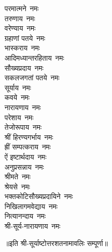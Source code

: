 \begin{flushleft}
\begin{multicols}{2}
परमात्मने~नमः\\
तरुणाय~नमः\\
वरेण्याय~नमः\\
ग्रहाणां पतये~नमः\\
भास्कराय~नमः\hfill{}\\
आदिमध्यान्तरहिताय~नमः\\
सौख्यप्रदाय~नमः\\
सकलजगतां पतये~नमः\\
सूर्याय~नमः\\
कवये~नमः\\
नारायणाय~नमः\\
परेशाय~नमः\\
तेजोरूपाय~नमः\\
श्रीं हिरण्यगर्भाय~नमः\\
ह्रीं सम्पत्कराय~नमः\hfill{}\\
ऐं इष्टार्थदाय~नमः\\
अनुप्रसन्नाय~नमः\\
श्रीमते~नमः\\
श्रेयसे~नमः\\
भक्तकोटिसौख्यप्रदायिने~नमः\\
निखिलागमवेद्याय~नमः\\
नित्यानन्दाय~नमः\\
श्री-सूर्य-नारायणाय~नमः\\
\end{multicols}
\end{flushleft}
॥इति श्री-सूर्याष्टोत्तरशतनामावलिः सम्पूर्णा॥
